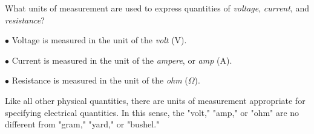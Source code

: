 

What units of measurement are used to express quantities of {\it voltage}, {\it current}, and {\it resistance}?







\medskip
\item{$\bullet$} Voltage is measured in the unit of the {\it volt} (V).
\item{$\bullet$} Current is measured in the unit of the {\it ampere}, or {\it amp} (A).
\item{$\bullet$} Resistance is measured in the unit of the {\it ohm} ($\Omega$).
\medskip







Like all other physical quantities, there are units of measurement appropriate for specifying electrical quantities.  In this sense, the "volt," "amp," or "ohm" are no different from "gram," "yard," or "bushel."




